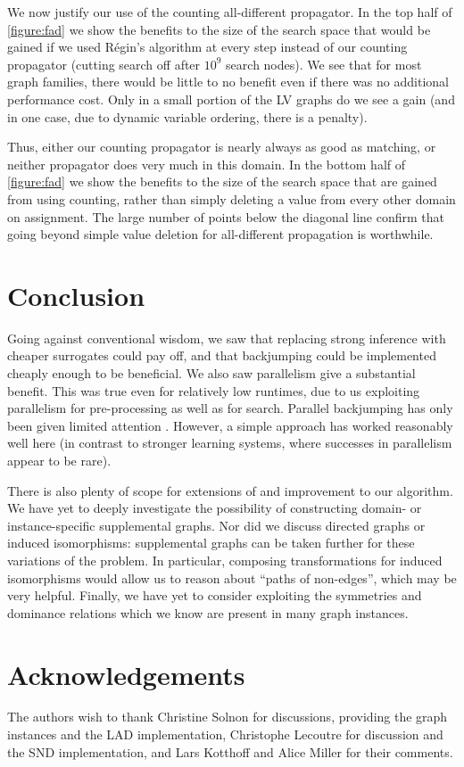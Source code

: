 \documentclass{llncs}
\begin{document}
We now justify our use of the counting all-different propagator. In the top half of
\cref{figure:fad} we show the benefits to the size of the search space that would be gained if we
used R\'egin's algorithm at every step instead of our counting propagator (cutting search off after
$10^9$ search nodes). We see that for most graph families, there would be little to no benefit even
if there was no additional performance cost. Only in a small portion of the LV graphs do we see a
gain (and in one case, due to dynamic variable ordering, there is a penalty).

Thus, either our counting propagator is nearly always as good as matching, or neither propagator
does very much in this domain. In the bottom half of \cref{figure:fad} we show the benefits to the
size of the search space that are gained from using counting, rather than simply deleting a value
from every other domain on assignment. The large number of points below the diagonal line confirm
that going beyond simple value deletion for all-different propagation is worthwhile.

\section{Conclusion}

Going against conventional wisdom, we saw that replacing strong inference with cheaper surrogates
could pay off, and that backjumping could be implemented cheaply enough to be beneficial. We also
saw parallelism give a substantial benefit. This was true even for relatively low runtimes, due to
us exploiting parallelism for pre-processing as well as for search.  Parallel backjumping has only
been given limited attention \cite{Conrad:1994,Habbas:1997,Cope:2000}.  However, a simple approach
has worked reasonably well here (in contrast to stronger learning systems, where successes in
parallelism appear to be rare).

There is also plenty of scope for extensions of and improvement to our algorithm. We have yet to
deeply investigate the possibility of constructing domain- or instance-specific supplemental graphs.
Nor did we discuss directed graphs or induced isomorphisms: supplemental graphs can be taken further
for these variations of the problem.  In particular, composing transformations for induced
isomorphisms would allow us to reason about ``paths of non-edges'', which may be very helpful.
Finally, we have yet to consider exploiting the symmetries and dominance relations which we know are
present in many graph instances.

\section*{Acknowledgements}

The authors wish to thank Christine Solnon for discussions, providing the graph instances and the
LAD implementation, Christophe Lecoutre for discussion and the SND implementation, and Lars Kotthoff
and Alice Miller for their comments.

\FloatBarrier


\end{document}
